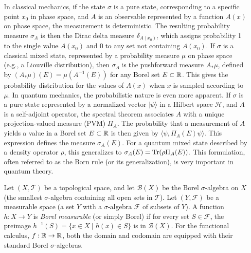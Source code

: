 \begin{example}
In classical mechanics, if the state $\sigma$ is a pure state, corresponding to a specific point $x_0$ in phase space, and $A$ is an observable represented by a function $A(x)$ on phase space, the measurement is deterministic. The resulting probability measure $\sigma_A$ is then the Dirac delta measure $\delta_{A(x_0)}$, which assigns probability 1 to the single value $A(x_0)$ and 0 to any set not containing $A(x_0)$. If $\sigma$ is a classical mixed state, represented by a probability measure $\mu$ on phase space (e.g., a Liouville distribution), then $\sigma_A$ is the pushforward measure $A_*\mu$, defined by $(A_*\mu)(E) = \mu(A^{-1}(E))$ for any Borel set $E \subset \mathbb{R}$. This gives the probability distribution for the values of $A(x)$ when $x$ is sampled according to $\mu$. In quantum mechanics, the probabilistic nature is even more apparent. If $\sigma$ is a pure state represented by a normalized vector $|\psi\rangle$ in a Hilbert space $\mathcal{H}$, and $A$ is a self-adjoint operator, the spectral theorem associates $A$ with a unique projection-valued measure (PVM) $\Pi_A$. The probability that a measurement of $A$ yields a value in a Borel set $E \subset \mathbb{R}$ is then given by $\langle\psi, \Pi_A(E)\psi\rangle$. This expression defines the measure $\sigma_A(E)$. For a quantum mixed state described by a density operator $\rho$, this generalizes to $\sigma_A(E) = \Tr(\rho \Pi_A(E))$. This formulation, often referred to as the Born rule (or its generalization), is very important in quantum theory.
\end{example}


\begin{definition}
Let $(X, \mathcal{T})$ be a topological space, and let $\mathcal{B}(X)$ be the Borel $\sigma$-algebra on $X$ (the smallest $\sigma$-algebra containing all open sets in $\mathcal{T}$). Let $(Y, \mathcal{F})$ be a measurable space (a set $Y$ with a $\sigma$-algebra $\mathcal{F}$ of subsets of $Y$). A function $h: X \to Y$ is \textit{Borel measurable} (or simply Borel) if for every set $S \in \mathcal{F}$, the preimage $h^{-1}(S) = \{x \in X \mid h(x) \in S\}$ is in $\mathcal{B}(X)$.
For the functional calculus, $f: \mathbb{R} \to \mathbb{R}$, both the domain and codomain are equipped with their standard Borel $\sigma$-algebras.
\end{definition}

